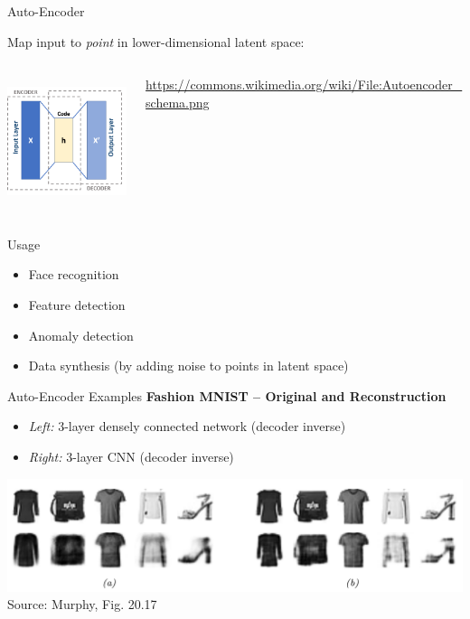 \documentclass[ignorenonframetext,xcolor=x11names]{beamer}
\begin{document}
\begin{frame}{Auto-Encoder}

Map input to \emph{point} in lower-dimensional latent space:

\begin{columns}
\begin{column}{.5\textwidth}
\begin{center}
\includegraphics[height=1.5in]{Autoencoder_schema.png}
\end{center}
\end{column}
\begin{column}{.4\textwidth}
\scriptsize \url{https://commons.wikimedia.org/wiki/File:Autoencoder_schema.png} \normalsize
\end{column}
\end{columns}

\begin{block}{Usage}
\begin{itemize}
   \item Face recognition
   \item Feature detection
   \item Anomaly detection
   \item Data synthesis (by adding noise to points in latent space)
\end{itemize}
\end{block}
\end{frame}
   
\begin{frame}{Auto-Encoder Examples}
\textbf{Fashion MNIST -- Original and Reconstruction}
\begin{itemize}
   \item \emph{Left:} 3-layer densely connected network (decoder inverse)
   \item \emph{Right:} 3-layer CNN (decoder inverse)
\end{itemize} 

\begin{center}
\includegraphics[width=\textwidth]{murphy_20_17.png} \\

\scriptsize Source: Murphy, Fig. 20.17 \normalsize
\end{center}
\end{frame}
\end{document}
